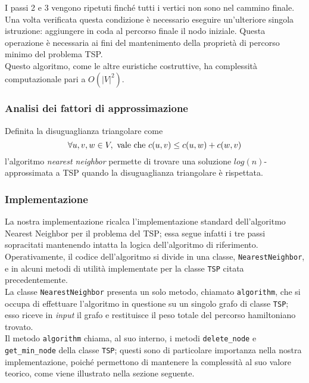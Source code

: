 I passi 2 e 3 vengono ripetuti finché tutti i vertici non sono nel cammino finale. Una volta verificata questa condizione è necessario eseguire un'ulteriore singola istruzione: aggiungere in coda al percorso finale il nodo iniziale. Questa operazione è necessaria ai fini del mantenimento della proprietà di percorso minimo del problema TSP. \\
Questo algoritmo, come le altre euristiche costruttive, ha complessità computazionale pari a $O(|V|^2)$.

\subsubsection{Analisi dei fattori di approssimazione}

Definita la disuguaglianza triangolare come 
\begin{equation}
    \forall u, v, w \in V, \textnormal{ vale che } c(u, v) \le c(u, w) + c(w, v)    
\end{equation}
l'algoritmo \textit{nearest neighbor} permette di trovare una soluzione $log(n)$-approssimata a TSP quando la disuguaglianza triangolare è rispettata.

\subsubsection{Implementazione}

La nostra implementazione ricalca l'implementazione standard dell'algoritmo Nearest Neighbor per il problema del TSP; essa segue infatti i tre passi sopracitati mantenendo intatta la logica dell'algoritmo di riferimento. \\
Operativamente, il codice dell'algoritmo si divide in una classe, \texttt{NearestNeighbor}, e in alcuni metodi di utilità implementate per la classe \texttt{TSP} citata precedentemente. \\
La classe \texttt{NearestNeighbor} presenta un solo metodo, chiamato \texttt{algorithm}, che si occupa di effettuare l'algoritmo in questione su un singolo grafo di classe \texttt{TSP}; esso riceve in \textit{input} il grafo e restituisce il peso totale del percorso hamiltoniano trovato. \\
Il metodo \texttt{algorithm} chiama, al suo interno, i metodi \texttt{delete\_node} e \texttt{get\_min\_node} della classe \texttt{TSP}; questi sono di particolare importanza nella nostra implementazione, poiché permettono di mantenere la complessità al suo valore teorico, come viene illustrato nella sezione seguente.

